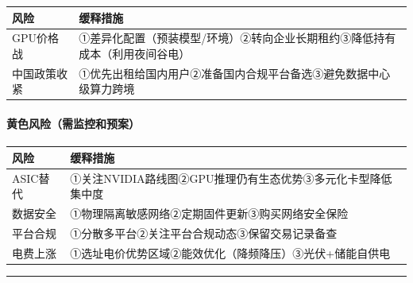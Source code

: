 \documentclass[UTF8,a4paper,12pt]{ctexart}
\begin{document}
{\def\LTcaptype{none} %
\begin{longtable}[]{@{}
  >{\raggedright\arraybackslash}p{}
  >{\raggedright\arraybackslash}p{}@{}}
\toprule\noalign{}
\begin{minipage}[b]{\linewidth}\raggedright
风险
\end{minipage} & \begin{minipage}[b]{\linewidth}\raggedright
缓释措施
\end{minipage} \\
\midrule\noalign{}
\endhead
\bottomrule\noalign{}
\endlastfoot
GPU价格战 &
①差异化配置（预装模型/环境）②转向企业长期租约③降低持有成本（利用夜间谷电） \\
中国政策收紧 &
①优先出租给国内用户②准备国内合规平台备选③避免数据中心级算力跨境 \\
\end{longtable}
}

\paragraph{黄色风险（需监控和预案）}\label{ux9ec4ux8272ux98ceux9669ux9700ux76d1ux63a7ux548cux9884ux6848}

{\def\LTcaptype{none} %
\begin{longtable}[]{@{}
  >{\raggedright\arraybackslash}p{}
  >{\raggedright\arraybackslash}p{}@{}}
\toprule\noalign{}
\begin{minipage}[b]{\linewidth}\raggedright
风险
\end{minipage} & \begin{minipage}[b]{\linewidth}\raggedright
缓释措施
\end{minipage} \\
\midrule\noalign{}
\endhead
\bottomrule\noalign{}
\endlastfoot
ASIC替代 & ①关注NVIDIA路线图②GPU推理仍有生态优势③多元化卡型降低集中度 \\
数据安全 & ①物理隔离敏感网络②定期固件更新③购买网络安全保险 \\
平台合规 & ①分散多平台②关注平台合规动态③保留交易记录备查 \\
电费上涨 & ①选址电价优势区域②能效优化（降频降压）③光伏+储能自供电 \\
\end{longtable}
}

\begin{center}\rule{0.5\linewidth}{0.5pt}\end{center}
\end{document}
